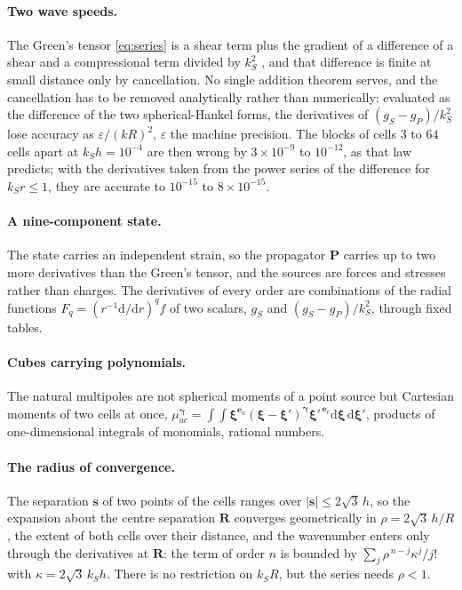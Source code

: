 \documentclass[11pt,a4paper]{article}
\newcommand{\bP}{\mathbf{P}}
\newcommand{\bR}{\mathbf{R}}
\newcommand{\bs}{\mathbf{s}}
\newcommand{\bxi}{\boldsymbol{\xi}}
\newcommand{\dd}{\mathrm{d}}
\begin{document}
\paragraph{Two wave speeds.} The Green's tensor \eqref{eq:series} is a shear term plus the gradient of a
difference of a shear and a compressional term divided by $k_S^2$ \citep{WuAki1985}, and that difference is finite at
small distance only by cancellation. No single addition theorem serves, and the cancellation has to be
removed analytically rather than numerically: evaluated as the difference of the two spherical-Hankel
forms, the derivatives of $(g_S-g_P)/k_S^2$ lose accuracy as $\varepsilon/(kR)^2$, $\varepsilon$ the
machine precision. The blocks of cells $3$ to $64$ cells apart at $k_Sh=10^{-4}$ are then wrong by
$3\times10^{-9}$ to $10^{-12}$, as that law predicts; with the derivatives taken from the power series of
the difference for $k_Sr\le1$, they are accurate to $10^{-15}$ to $8\times10^{-15}$.

\paragraph{A nine-component state.} The state carries an independent strain, so the propagator $\bP$
carries up to two more derivatives than the Green's tensor, and the sources are forces and stresses
rather than charges. The derivatives of every order are combinations of the radial functions
$F_q=(r^{-1}\dd/\dd r)^q f$ of two scalars, $g_S$ and $(g_S-g_P)/k_S^2$, through fixed tables.

\paragraph{Cubes carrying polynomials.} The natural multipoles are not spherical moments of a point
source but Cartesian moments of two cells at once,
$\mu^{\boldsymbol\gamma}_{ac}=\int\!\!\int\bxi^{\mathbf e_a}(\bxi-\bxi')^{\boldsymbol\gamma}\bxi'^{\,\mathbf e_c}
\dd\bxi\,\dd\bxi'$, products of one-dimensional integrals of monomials, rational numbers.

\paragraph{The radius of convergence.} The separation $\bs$ of two points of the cells ranges over
$|\bs|\le2\sqrt3\,h$, so the expansion about the centre separation $\bR$ converges geometrically in
$\rho=2\sqrt3\,h/R$, the extent of both cells over their distance, and the wavenumber enters only through
the derivatives at $\bR$: the term of order $n$ is bounded by $\sum_j\rho^{\,n-j}\kappa^j/j!$ with
$\kappa=2\sqrt3\,k_Sh$. There is no restriction on $k_SR$, but the series needs $\rho<1$.
\end{document}
